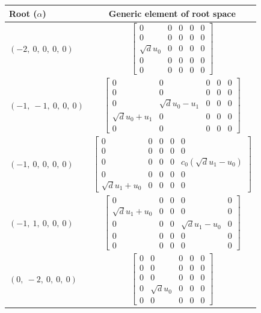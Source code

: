 \documentclass[11pt]{article}
\theoremstyle{definition}
\begin{document}
\noindent \begin{tabular}{|l|c|}
    \hline
    \textbf{Root ($\alpha$)} & \textbf{Generic element of root space} \\
    \hline
    $\left( -2, \  0, \  0, \  0, \  0\right)$ & $\left[\begin{matrix}0 & 0 & 0 & 0 & 0\\0 & 0 & 0 & 0 & 0\\\sqrt{d} u_{0} & 0 & 0 & 0 & 0\\0 & 0 & 0 & 0 & 0\\0 & 0 & 0 & 0 & 0\end{matrix}\right]$ \\
    \hline
    $\left( -1, \  -1, \  0, \  0, \  0\right)$ & $\left[\begin{matrix}0 & 0 & 0 & 0 & 0\\0 & 0 & 0 & 0 & 0\\0 & \sqrt{d} u_{0} - u_{1} & 0 & 0 & 0\\\sqrt{d} u_{0} + u_{1} & 0 & 0 & 0 & 0\\0 & 0 & 0 & 0 & 0\end{matrix}\right]$ \\
    \hline
    $\left( -1, \  0, \  0, \  0, \  0\right)$ & $\left[\begin{matrix}0 & 0 & 0 & 0 & 0\\0 & 0 & 0 & 0 & 0\\0 & 0 & 0 & 0 & c_{0} \left(\sqrt{d} u_{1} - u_{0}\right)\\0 & 0 & 0 & 0 & 0\\\sqrt{d} u_{1} + u_{0} & 0 & 0 & 0 & 0\end{matrix}\right]$ \\
    \hline
    $\left( -1, \  1, \  0, \  0, \  0\right)$ & $\left[\begin{matrix}0 & 0 & 0 & 0 & 0\\\sqrt{d} u_{1} + u_{0} & 0 & 0 & 0 & 0\\0 & 0 & 0 & \sqrt{d} u_{1} - u_{0} & 0\\0 & 0 & 0 & 0 & 0\\0 & 0 & 0 & 0 & 0\end{matrix}\right]$ \\
    \hline
    $\left( 0, \  -2, \  0, \  0, \  0\right)$ & $\left[\begin{matrix}0 & 0 & 0 & 0 & 0\\0 & 0 & 0 & 0 & 0\\0 & 0 & 0 & 0 & 0\\0 & \sqrt{d} u_{0} & 0 & 0 & 0\\0 & 0 & 0 & 0 & 0\end{matrix}\right]$ \\

\end{tabular}
\end{document}
